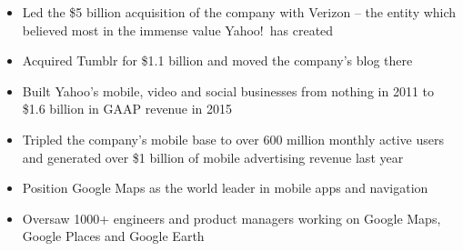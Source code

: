 \documentclass[10pt,a4paper,ragged2e]{altacv}
\begin{document}

\begin{fullwidth}
\makecvheader
\end{fullwidth}



\begin{itemize}
\item Led the \$5 billion acquisition of the company with Verizon -- the entity which believed most in the immense value Yahoo!\ has created
\item Acquired Tumblr for \$1.1 billion and moved the company's blog there
\item Built Yahoo's mobile, video and social businesses from nothing in 2011 to \$1.6 billion in GAAP revenue in 2015
\item Tripled the company's mobile base to over 600 million monthly active users and generated over \$1 billion of mobile advertising revenue last year
\end{itemize}

\divider

\begin{itemize}
\item Position Google Maps as the world leader in mobile apps and navigation
\item Oversaw 1000+ engineers and product managers working on Google Maps, Google Places and Google Earth
\end{itemize}
\end{document}
